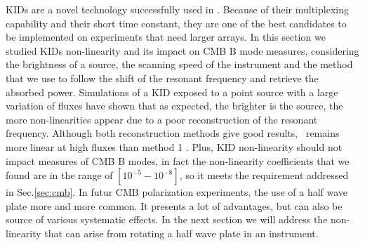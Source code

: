 KIDs are a novel technology successfully used in \nikad . Because of their multiplexing capability and their short time constant, they are one of the best candidates to be implemented on experiments that need larger arrays. In this section we studied KIDs non-linearity and its impact on CMB B mode measures, considering the brightness of a source, the scanning speed of the instrument and the method that we use to follow the shift of the resonant frequency and retrieve the absorbed power.
Simulations of a KID exposed to a point source with a large variation of fluxes have shown that as expected, the brighter is the source, the more non-linearities appear due to a poor reconstruction of the resonant frequency. Although both reconstruction methods give good results, \cf\ remains more linear at high fluxes than method 1 . Plus, KID non-linearity should not impact measures of CMB B modes, in fact the non-linearity coefficients that we found are in the range of $[10^{-5} - 10^{-8}]$, so it meets the requirement addressed in Sec.\ref{sec:cmb}.
In futur CMB polarization experiments, the use of a half wave plate more and more common. It presents a lot of advantages, but can also be source of various systematic effects. In the next section we will address the non-linearity that can arise from rotating a half wave plate in an instrument.
